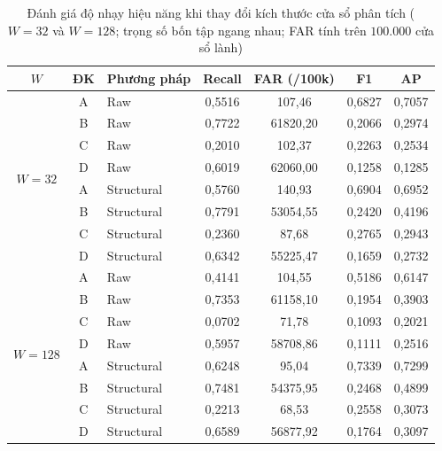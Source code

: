 \documentclass[12pt, a4paper, reqno, oneside]{book}
\begin{document}
{{\renewcommand{\arraystretch}{0.85}
\begin{table}[htbp]
\centering\footnotesize\setlength{\tabcolsep}{5pt}
\caption[Độ nhạy hiệu năng theo kích thước cửa sổ $W=32$ và $W=128$]{Đánh giá độ nhạy hiệu năng khi thay đổi kích thước cửa sổ phân tích ($W=32$ và $W=128$; trọng số bốn tập ngang nhau; FAR tính trên $100.000$ cửa sổ lành)}\label{tab:extension-w32}
\vspace{2pt}
\begin{tabular}{cclcccc}
\toprule
$W$ & ĐK & Phương pháp & Recall & FAR (/100k) & F1 & AP\\\midrule
\multirow{8}{*}{$W=32$} 
 & A & Raw & 0,5516 & 107,46 & 0,6827 & 0,7057\\
 & B & Raw & 0,7722 & 61820,20 & 0,2066 & 0,2974\\
 & C & Raw & 0,2010 & 102,37 & 0,2263 & 0,2534\\
 & D & Raw & 0,6019 & 62060,00 & 0,1258 & 0,1285\\
 & A & Structural & 0,5760 & 140,93 & 0,6904 & 0,6952\\
 & B & Structural & 0,7791 & 53054,55 & 0,2420 & 0,4196\\
 & C & Structural & 0,2360 & 87,68 & 0,2765 & 0,2943\\
 & D & Structural & 0,6342 & 55225,47 & 0,1659 & 0,2732\\\midrule
\multirow{8}{*}{$W=128$} 
 & A & Raw & 0,4141 & 104,55 & 0,5186 & 0,6147\\
 & B & Raw & 0,7353 & 61158,10 & 0,1954 & 0,3903\\
 & C & Raw & 0,0702 & 71,78 & 0,1093 & 0,2021\\
 & D & Raw & 0,5957 & 58708,86 & 0,1111 & 0,2516\\
 & A & Structural & 0,6248 & 95,04 & 0,7339 & 0,7299\\
 & B & Structural & 0,7481 & 54375,95 & 0,2468 & 0,4899\\
 & C & Structural & 0,2213 & 68,53 & 0,2558 & 0,3073\\
 & D & Structural & 0,6589 & 56877,92 & 0,1764 & 0,3097\\
\bottomrule
\end{tabular}
\end{table}}

}
\end{document}
